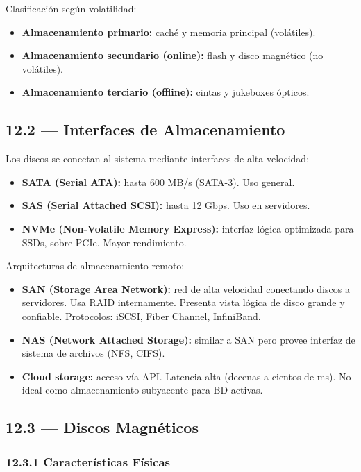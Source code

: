 \documentclass[11pt, a4paper]{article}
\begin{document}
Clasificación según volatilidad:
\begin{itemize}[nosep]
	\item \textbf{Almacenamiento primario:} caché y memoria principal (volátiles).
	\item \textbf{Almacenamiento secundario (online):} flash y disco magnético (no volátiles).
	\item \textbf{Almacenamiento terciario (offline):} cintas y jukeboxes ópticos.
\end{itemize}

\subsection{12.2 --- Interfaces de Almacenamiento}

Los discos se conectan al sistema mediante interfaces de alta velocidad:
\begin{itemize}[nosep]
	\item \textbf{SATA (Serial ATA):} hasta 600 MB/s (SATA-3). Uso general.
	\item \textbf{SAS (Serial Attached SCSI):} hasta 12 Gbps. Uso en servidores.
	\item \textbf{NVMe (Non-Volatile Memory Express):} interfaz lógica optimizada para SSDs, sobre PCIe. Mayor rendimiento.
\end{itemize}

Arquitecturas de almacenamiento remoto:
\begin{itemize}[nosep]
	\item \textbf{SAN (Storage Area Network):} red de alta velocidad conectando discos a servidores. Usa RAID internamente. Presenta vista lógica de disco grande y confiable. Protocolos: iSCSI, Fiber Channel, InfiniBand.
	\item \textbf{NAS (Network Attached Storage):} similar a SAN pero provee interfaz de sistema de archivos (NFS, CIFS).
	\item \textbf{Cloud storage:} acceso vía API. Latencia alta (decenas a cientos de ms). No ideal como almacenamiento subyacente para BD activas.
\end{itemize}

\subsection{12.3 --- Discos Magnéticos}

\subsubsection{12.3.1 Características Físicas}
\end{document}
